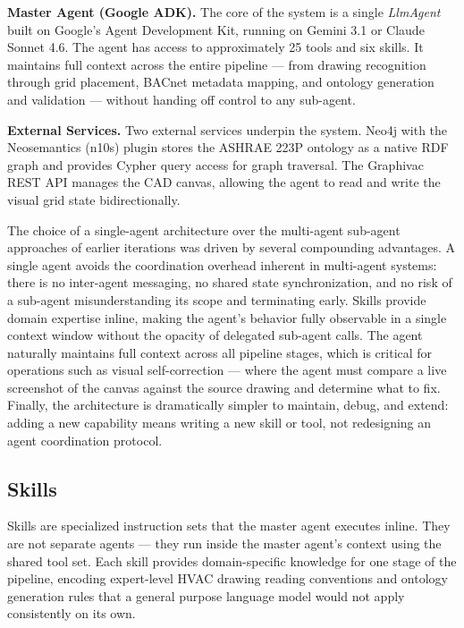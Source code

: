 \textbf{Master Agent (Google ADK).}
The core of the system is a single \textit{LlmAgent} built on Google's Agent Development
Kit, running on Gemini 3.1 or Claude Sonnet 4.6. The agent has access to approximately
25 tools and six skills. It maintains full context across the entire pipeline --- from
drawing recognition through grid placement, BACnet metadata mapping, and ontology
generation and validation --- without handing off control to any sub-agent.

\textbf{External Services.}
Two external services underpin the system. Neo4j with the Neosemantics (n10s) plugin
stores the ASHRAE 223P ontology as a native RDF graph and provides Cypher query access
for graph traversal. The Graphivac REST API manages the CAD canvas, allowing the agent
to read and write the visual grid state bidirectionally.

\medskip
\noindent
The choice of a single-agent architecture over the multi-agent sub-agent approaches of
earlier iterations was driven by several compounding advantages.
A single agent avoids the coordination overhead inherent in multi-agent systems: there is
no inter-agent messaging, no shared state synchronization, and no risk of a sub-agent
misunderstanding its scope and terminating early.
Skills provide domain expertise inline, making the agent's behavior fully observable in a
single context window without the opacity of delegated sub-agent calls.
The agent naturally maintains full context across all pipeline stages, which is critical
for operations such as visual self-correction --- where the agent must compare a live
screenshot of the canvas against the source drawing and determine what to fix.
Finally, the architecture is dramatically simpler to maintain, debug, and extend: adding
a new capability means writing a new skill or tool, not redesigning an agent coordination
protocol.

\subsection{Skills}

Skills are specialized instruction sets that the master agent executes inline. They are
not separate agents --- they run inside the master agent's context using the shared tool
set. Each skill provides domain-specific knowledge for one stage of the pipeline, encoding
expert-level HVAC drawing reading conventions and ontology generation rules that a general
purpose language model would not apply consistently on its own.

